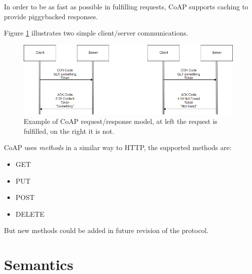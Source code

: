 	In order to be as fast as possible in fulfilling requests, CoAP supports caching to provide piggybacked responses.\newline
	
	Figure \ref{fig:coap0} illustrates two simple client/server communications.
	
	\begin{figure}
		\includegraphics[width=\linewidth]{coap-img0.png}
		\caption{Example of CoAP request/response model, at left the request is fulfilled, on the right it is not.}
		\label{fig:coap0}
	\end{figure}
	
	CoAP uses \emph{methods} in a similar way to HTTP, the supported methods are: \newline
	\begin{itemize}
		\item GET
		\item PUT
		\item POST
		\item DELETE
	\end{itemize}
	But new methods could be added in future revision of the protocol.\newline
	
	\section{Semantics}\label{sc:semantics}
	
